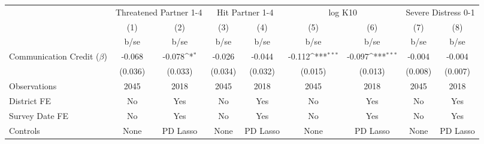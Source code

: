 {
\def\sym#1{\ifmmode^{#1}\else\(^{#1}\)\fi}
\begin{tabular}{l*{8}{c}}
\hline\hline
                                                  &\multicolumn{2}{c}{Threatened Partner 1-4} &\multicolumn{2}{c}{Hit Partner 1-4}        &\multicolumn{2}{c}{log K10}                &\multicolumn{2}{c}{Severe Distress 0-1}    \\\cmidrule(lr){2-3}\cmidrule(lr){4-5}\cmidrule(lr){6-7}\cmidrule(lr){8-9}
                                                  &\multicolumn{1}{c}{(1)}         &\multicolumn{1}{c}{(2)}         &\multicolumn{1}{c}{(3)}         &\multicolumn{1}{c}{(4)}         &\multicolumn{1}{c}{(5)}         &\multicolumn{1}{c}{(6)}         &\multicolumn{1}{c}{(7)}         &\multicolumn{1}{c}{(8)}         \\
                                                  &        b/se         &        b/se         &        b/se         &        b/se         &        b/se         &        b/se         &        b/se         &        b/se         \\
\hline
Communication Credit ($\beta$)                    &      -0.068         &      -0.078\sym{*}  &      -0.026         &      -0.044         &      -0.112\sym{***}&      -0.097\sym{***}&      -0.004         &      -0.004         \\
                                                  &     (0.036)         &     (0.033)         &     (0.034)         &     (0.032)         &     (0.015)         &     (0.013)         &     (0.008)         &     (0.007)         \\
\hline
Observations                                      &        2045         &        2018         &        2045         &        2018         &        2045         &        2018         &        2045         &        2018         \\
District FE                                       &          No         &         Yes         &          No         &         Yes         &          No         &         Yes         &          No         &         Yes         \\
Survey Date FE                                    &          No         &         Yes         &          No         &         Yes         &          No         &         Yes         &          No         &         Yes         \\
Controls                                          &        None         &    PD Lasso         &        None         &    PD Lasso         &        None         &    PD Lasso         &        None         &    PD Lasso         \\

\end{tabular}}
